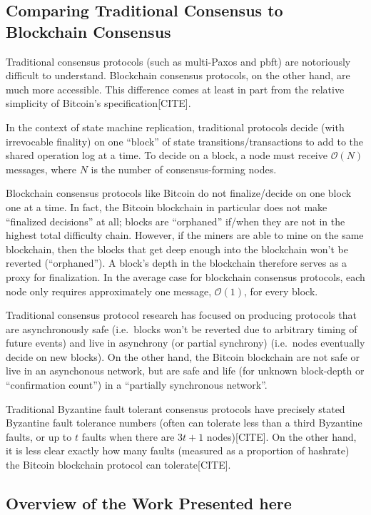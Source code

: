 \documentclass{article}
\theoremstyle{definition}
\begin{document}
\subsection{Comparing Traditional Consensus to Blockchain Consensus}

Traditional consensus protocols (such as multi-Paxos and pbft) are notoriously difficult to understand\cite{paxos}. Blockchain consensus protocols, on the other hand, are much more accessible. This difference comes at least in part from the relative simplicity of Bitcoin's specification[CITE].

In the context of state machine replication, traditional protocols decide (with irrevocable finality) on one ``block'' of state transitions/transactions to add to the shared operation log at a time. To decide on a block, a node must receive $\mathcal{O}(N)$ messages, where $N$ is the number of consensus-forming nodes.

Blockchain consensus protocols like Bitcoin do not finalize/decide on one block one at a time. In fact, the Bitcoin blockchain in particular does not make ``finalized decisions'' at all; blocks are ``orphaned'' if/when they are not in the highest total difficulty chain. However, if the miners are able to mine on the same blockchain, then the blocks that get deep enough into the blockchain won't be reverted (``orphaned''). A block's depth in the blockchain therefore serves as a proxy for finalization. In the average case for blockchain consensus protocols, each node only requires approximately one message, $\mathcal{O}(1)$, for every block.

Traditional consensus protocol research has focused on producing protocols that are asynchronously safe (i.e.\ blocks won't be reverted due to arbitrary timing of future events) and live in asynchrony (or partial synchrony) (i.e.\ nodes eventually decide on new blocks). On the other hand, the Bitcoin blockchain are not safe or live in an asynchonous network, but are safe and life (for unknown block-depth or ``confirmation count'') in a ``partially synchronous network''.

Traditional Byzantine fault tolerant consensus protocols have precisely stated Byzantine fault tolerance numbers (often can tolerate less than a third Byzantine faults, or up to $t$ faults when there are $3t + 1$ nodes)[CITE]. On the other hand, it is less clear exactly how many faults (measured as a proportion of hashrate) the Bitcoin blockchain protocol can tolerate[CITE].

\subsection{Overview of the Work Presented here}
\end{document}
